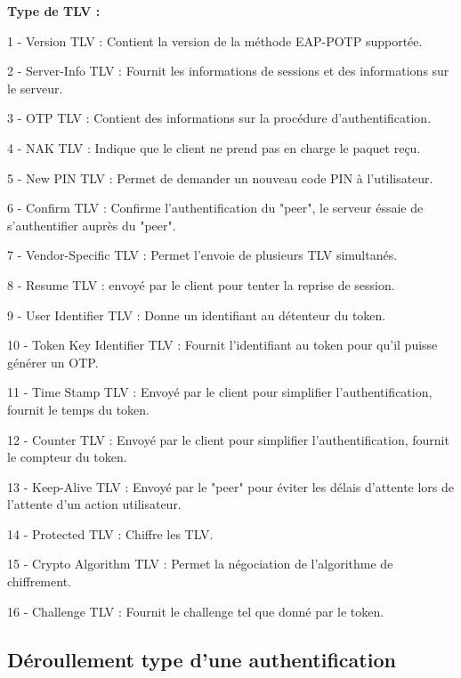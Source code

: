 \documentclass{../res/univ-projet}
\begin{document}
\begin{description}
   \item \textbf{Type de TLV :}
\item   1 - Version TLV : Contient la version de la méthode EAP-POTP supportée.
\item   2 - Server-Info TLV : Fournit les informations de sessions et des informations sur le serveur.
\item   3 - OTP TLV : Contient des informations sur la procédure d'authentification.
\item   4 - NAK TLV : Indique que le client ne prend pas en charge le paquet reçu.
\item   5 - New PIN TLV : Permet de demander un nouveau code PIN à l'utilisateur.
\item   6 - Confirm TLV : Confirme l'authentification du "peer", le serveur éssaie de s'authentifier auprès du "peer".
\item   7 - Vendor-Specific TLV : Permet l'envoie de plusieurs TLV simultanés.
\item   8 - Resume TLV : envoyé par le client pour tenter la reprise de session.
\item   9 - User Identifier TLV : Donne un identifiant au détenteur du token.
\item 10 - Token Key Identifier TLV : Fournit l'identifiant au token pour qu'il puisse générer un OTP.
\item 11 - Time Stamp TLV : Envoyé par le client pour simplifier l'authentification, fournit le temps du token.
\item 12 - Counter TLV : Envoyé par le client pour simplifier l'authentification, fournit le compteur du token.
\item 13 - Keep-Alive TLV : Envoyé par le "peer" pour éviter les délais d'attente lors de l'attente d'un action utilisateur.
\item 14 - Protected TLV : Chiffre les TLV.
\item 15 - Crypto Algorithm TLV : Permet la négociation de l'algorithme de chiffrement.
\item 16 - Challenge TLV : Fournit le challenge tel que donné par le token.
\end{description}


\subsection{Déroullement type d'une authentification}
\end{document}
